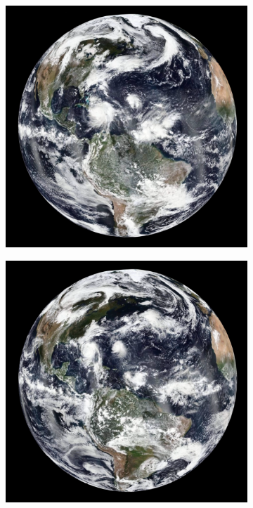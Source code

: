 \documentclass[journal]{vgtc}                %
\begin{document}
\begin{figure}
    \centering
    \begin{subfigure}[tb]{0.32\linewidth}
    	\includegraphics[width=\textwidth]{earth_temporal/earth_temporal_viirs1.png}
	\end{subfigure}
    \begin{subfigure}[tb]{0.32\linewidth}
    	\includegraphics[width=\textwidth]{earth_temporal/earth_temporal_viirs2.png}

\end{subfigure}
\end{figure}
\end{document}
